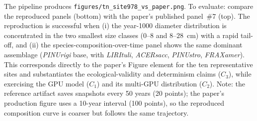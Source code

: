 \documentclass[conference]{IEEEtran}
\begin{document}
\artout

The pipeline produces \texttt{figures/tn\_site978\_vs\_paper.png}. To evaluate:
compare the reproduced panels (bottom) with the paper's published panel~\#7 (top). The
reproduction is successful when (i) the year-1000 diameter distribution is concentrated
in the two smallest size classes ($0$--$8$ and $8$--$28$~cm) with a rapid tail-off, and
(ii) the species-composition-over-time panel shows the same dominant assemblage
(\textit{PINUrigi} base, with \textit{LIRItuli}, \textit{ACERsacc}, \textit{PINUstro},
\textit{FRAXamer}). This corresponds directly to the paper's Figure element for the ten
representative sites and substantiates the ecological-validity and determinism claims
($C_3$), while exercising the GPU model ($C_1$) and its multi-GPU distribution ($C_2$).
Note: the reference artifact saves snapshots every 50 years (20 points); the paper's
production figure uses a 10-year interval (100 points), so the reproduced composition
curve is coarser but follows the same trajectory.
\end{document}
